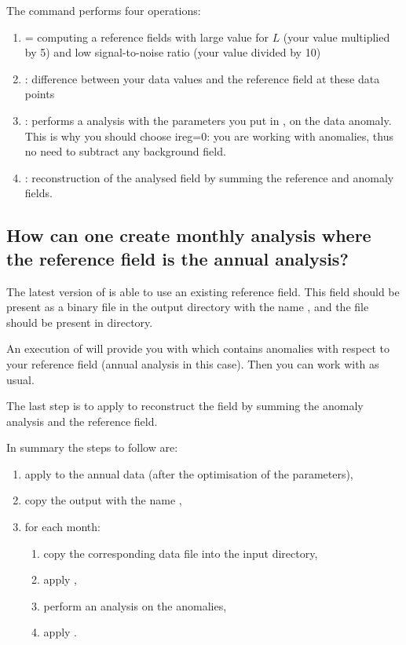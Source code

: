The command  performs four operations:
\begin{enumerate}
\item {} = computing a reference fields with large value for $L$ (your
value multiplied by 5) and low signal-to-noise ratio (your value divided by 10)

\item {}: difference between your data values and the reference field at
these data points

\item {}: performs a \diva analysis with the parameters you put in
, on the data anomaly. This is why you should choose ireg=0: you
are working with anomalies, thus no need to subtract any background field.

\item {}: reconstruction of the analysed field by summing the reference
and anomaly fields.

\end{enumerate}


\subsection{How can one create monthly analysis where the reference field is the annual analysis?}

The latest version of  is able to use an existing reference field. This field should be present as a binary file in the output directory with the name , and the  file should be present in  directory.

An execution of  will provide you with  which contains anomalies with respect to your reference field (annual analysis in this case). Then you can work with  as usual. 

The last step is to apply  to reconstruct the field by summing the anomaly analysis and the reference field.

In summary the steps to follow are:

\begin{enumerate} 
\item apply  to the annual data (after the optimisation of the parameters),
\item copy the output  with the name ,
\item for each month:
\begin{enumerate}
\item copy the corresponding data file into the input directory,
\item apply ,
\item perform an analysis on the anomalies,
\item apply .
\end{enumerate}									 
\end{enumerate}
									 
